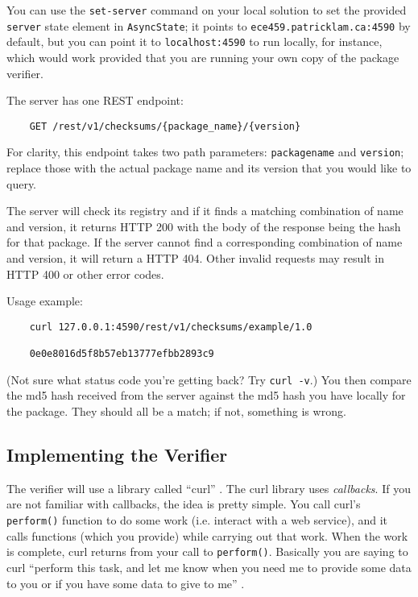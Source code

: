\documentclass[12pt]{article}
\renewcommand{\_}{\kern-1.5pt\textunderscore\kern-1.5pt}
\begin{document}
\vspace{1em}
You can use the \texttt{set-server} command on your local solution to set the provided \texttt{server} state element in \texttt{AsyncState}; it points to \texttt{ece459.patricklam.ca:4590} by default, but you can point it to \texttt{localhost:4590} to run locally, for instance, which would work provided that you are running your own copy of the package verifier. \par 

\vspace{1em}
The server has one REST endpoint: 
\begin{verbatim}
    GET /rest/v1/checksums/{package_name}/{version}
\end{verbatim}

For clarity, this endpoint takes two path parameters: \texttt{package\_name} and \texttt{version}; replace those with the actual package name and its version that you would like to query.\par

\vspace{1em}
The server will check its registry and if it finds a matching combination of name and version, it returns HTTP 200 with the body of the response being the hash for that package. If the server cannot find a corresponding combination of name and version, it will return a HTTP 404. Other invalid requests may result in HTTP 400 or other error codes. \par

\vspace{1em}
Usage example:

\begin{verbatim}
    curl 127.0.0.1:4590/rest/v1/checksums/example/1.0

    0e0e8016d5f8b57eb13777efbb2893c9
\end{verbatim}

(Not sure what status code you're getting back? Try \verb+curl -v+.) You then compare the md5 hash received from the server against the md5 hash you have locally for the package. They should all be a match; if not, something is wrong.

\subsection*{Implementing the Verifier}

\vspace{1em}
The verifier will use a library called ``curl'' . The curl library uses \textit{callbacks}. If you are not familiar with callbacks, the idea is pretty simple. You call curl's \texttt{perform()} function to do some work (i.e. interact with a web service), and it calls functions (which you provide) while carrying out that work. When the work is complete, curl returns from your call to \texttt{perform()}. Basically you are saying to curl ``perform this task, and let me know when you need me to provide some data to you or if you have some data to give to me'' .\par
\end{document}
